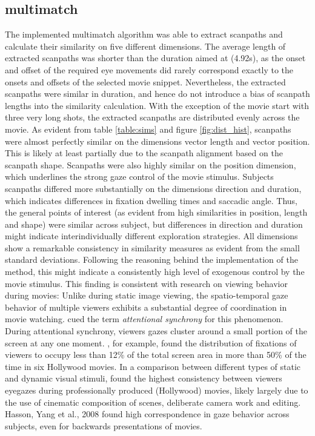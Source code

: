 \documentclass[a4paper, 12pt]{scrreprt}
\begin{document}
\subsection{multimatch}
The implemented multimatch algorithm was able to extract scanpaths and calculate their similarity on five different dimensions. The average length of extracted scanpaths was shorter than the duration aimed at (4.92s), as the onset and offset of the required eye movements did rarely correspond exactly to the onsets and offsets of the selected movie snippet. Nevertheless, the extracted scanpaths were similar in duration, and hence do not introduce a bias of scanpath lengths into the similarity calculation. With the exception of the movie start with three very long shots, the extracted scanpaths are distributed evenly across the movie. As evident from table \ref{table:sims} and figure \ref{fig:dist_hist}, scanpaths were almost perfectly similar on the dimensions vector length and vector position. This is likely at least partially due to the scanpath alignment based on the scanpath shape. Scanpaths were also highly similar on the position dimension, which underlines the strong gaze control of the movie stimulus. Subjects scanpaths differed more substantially on the dimensions direction and duration, which indicates differences in fixation dwelling times and saccadic angle. Thus, the general points of interest (as evident from high similarities in position, length and shape) were similar across subject, but differences in direction and duration might indicate interindividually different exploration strategies. All dimensions show a remarkable consistency in similarity measures as evident from the small standard deviations. Following the reasoning behind the implementation of the method, this might indicate a consistently high level of exogenous control by the movie stimulus. This finding is consistent with research on viewing behavior during movies: Unlike during static image viewing, the spatio-temporal gaze behavior of multiple viewers exhibits a substantial degree of coordination in movie watching. \textcite{smith2008attentional} cued the term \textit{attentional synchrony} for this phenomenon. During attentional synchrony, viewers gazes cluster around a small portion of the screen at any one moment. \textcite{goldstein2007people}, for example, found the distribution of fixations of viewers to occupy less than 12\% of the total screen area in more than 50\% of the time in six Hollywood movies. In a comparison between different types of static and dynamic visual stimuli, \textcite{dorr2010variability} found the highest consistency between viewers eyegazes during professionally produced (Hollywood) movies, likely largely due to the use of cinematic composition of scenes, deliberate camera work and editing. Hasson, Yang et al., 2008 found high correspondence in gaze behavior across subjects, even for backwards presentations of movies. \newline
\end{document}
